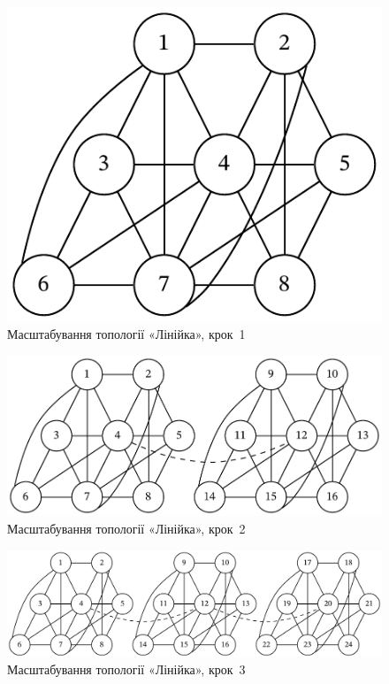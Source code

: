 \documentclass[
	a4paper,
	oneside,
	BCOR = 10mm,
	DIV = 12,
	12pt,
	headings = normal,
]{scrartcl}
\begin{document}
				\begin{figure}[!htbp]
					\centering
					\includegraphics[height=6\baselineskip]{./assets/cluster-08-01-named.pdf}
					\caption{Масштабування топології «Лінійка», крок~1}
					\label{fig:cluster-08-02-line-s01}
				\end{figure}

				\begin{figure}[!htbp]
					\centering
					\includegraphics[height=6\baselineskip]{./assets/cluster-08-02-line-s02.pdf}
					\caption{Масштабування топології «Лінійка», крок~2}
					\label{fig:cluster-08-02-line-s02}
				\end{figure}

				\begin{figure}[!htbp]
					\centering
					\includegraphics[width=\columnwidth]{./assets/cluster-08-02-line-s03.pdf}
					\caption{Масштабування топології «Лінійка», крок~3}
					\label{fig:cluster-08-02-line-s03}
				\end{figure}
\end{document}
